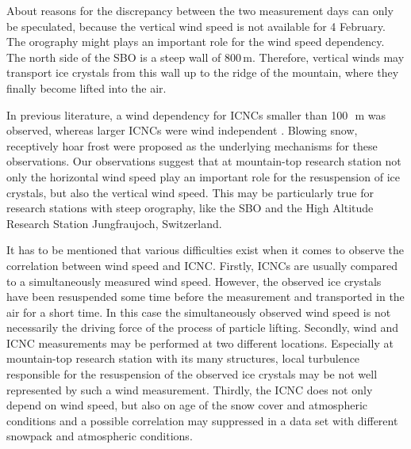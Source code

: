 \documentclass[draft,linenumbers]{agujournal}
\begin{document}
About reasons for the discrepancy between the two measurement days can only be speculated, because the vertical wind speed is not available for 4 February. The orography might plays an important role for the wind speed dependency. The north side of the SBO is a steep wall of 800\,\si{m}. Therefore, vertical winds may transport ice crystals from this wall up to the ridge of the mountain, where they finally become lifted into the air. 


In previous literature, a wind dependency for ICNCs smaller than 100\,\si{\mu m} was observed, whereas larger ICNCs were wind independent \citep{Loy15}. 
Blowing snow, receptively hoar frost were proposed as the underlying mechanisms for these observations. Our observations suggest that at mountain-top research station not only the horizontal wind speed play an important role for the resuspension of ice crystals, but also the vertical wind speed. This may be particularly true for research stations with steep orography, like the SBO and the High Altitude Research Station Jungfraujoch, Switzerland. 

It has to be mentioned that various difficulties exist when it comes to observe the correlation between wind speed and ICNC. Firstly, ICNCs are usually compared to a simultaneously measured wind speed. However, the observed ice crystals have been resuspended some time before the measurement and transported in the air for a short time. 
In this case the simultaneously observed wind speed is not necessarily the driving force of the process of particle lifting. 
Secondly, wind and ICNC measurements may be performed at two different locations. Especially at mountain-top research station with its many structures, local turbulence responsible for the resuspension of the observed ice crystals may be not well represented by such a wind measurement. 
Thirdly, the ICNC does not only depend on wind speed, but also on age of the snow cover and atmospheric conditions and a possible correlation may suppressed in a data set with different snowpack and atmospheric conditions.
\end{document}
